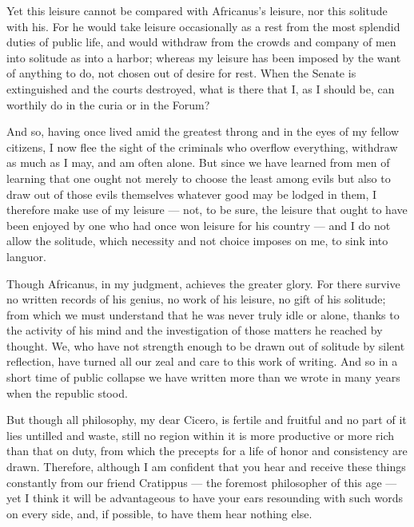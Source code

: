  Yet this leisure cannot be compared with Africanus's leisure, nor this solitude with his. For he would take leisure occasionally as a rest from the most splendid duties of public life, and would withdraw from the crowds and company of men into solitude as into a harbor; whereas my leisure has been imposed by the want of anything to do, not chosen out of desire for rest. When the Senate is extinguished and the courts destroyed, what is there that I, as I should be, can worthily do in the curia or in the Forum?

 And so, having once lived amid the greatest throng and in the eyes of my fellow citizens, I now flee the sight of the criminals who overflow everything, withdraw as much as I may, and am often alone. But since we have learned from men of learning that one ought not merely to choose the least among evils but also to draw out of those evils themselves whatever good may be lodged in them, I therefore make use of my leisure — not, to be sure, the leisure that ought to have been enjoyed by one who had once won leisure for his country — and I do not allow the solitude, which necessity and not choice imposes on me, to sink into languor.

 Though Africanus, in my judgment, achieves the greater glory. For there survive no written records of his genius, no work of his leisure, no gift of his solitude; from which we must understand that he was never truly idle or alone, thanks to the activity of his mind and the investigation of those matters he reached by thought. We, who have not strength enough to be drawn out of solitude by silent reflection, have turned all our zeal and care to this work of writing. And so in a short time of public collapse we have written more than we wrote in many years when the republic stood.

 But though all philosophy, my dear Cicero, is fertile and fruitful and no part of it lies untilled and waste, still no region within it is more productive or more rich than that on duty, from which the precepts for a life of honor and consistency are drawn. Therefore, although I am confident that you hear and receive these things constantly from our friend Cratippus — the foremost philosopher of this age — yet I think it will be advantageous to have your ears resounding with such words on every side, and, if possible, to have them hear nothing else.

